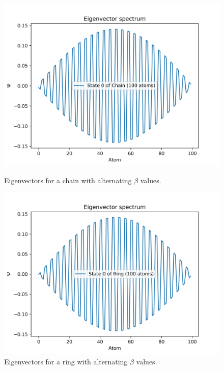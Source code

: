 \documentclass{article}
\begin{document}
\begin{figure}[h]
\begin{minipage}{0.45\textwidth}
    \end{minipage}
    \vfill
    \begin{minipage}{0.45\textwidth}
        \centering
        \includegraphics[width=\textwidth]{Figures/chain_beta_eigenvectors.jpg}
        \caption{Eigenvectors for a chain with alternating $\beta$ values.}
        \label{fig:chain_beta_eigenvectors}
    \end{minipage}
    \hfill
    \begin{minipage}{0.45\textwidth}
        \centering
        \includegraphics[width=\textwidth]{Figures/ring_beta_eigenvectors.jpg}
        \caption{Eigenvectors for a ring with alternating $\beta$ values.}
        \label{fig:ring_beta_eigenvectors}
    \end{minipage}
\end{figure}

\end{document}

